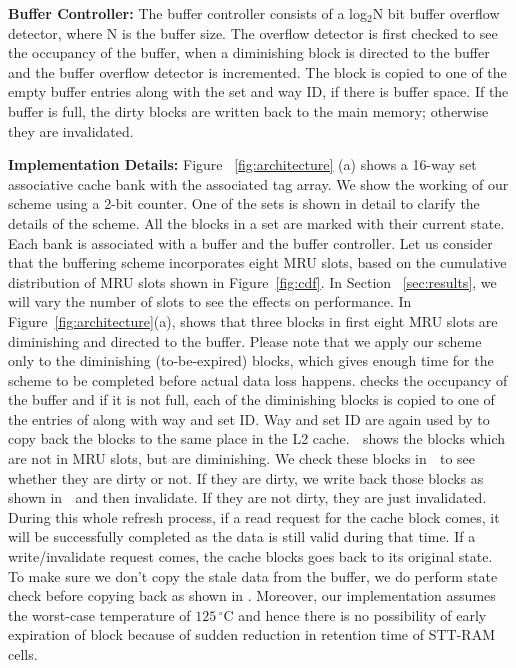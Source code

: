 \noindent\textbf{Buffer Controller:}
The buffer controller consists of a log$_2$N bit buffer overflow detector, where N is the buffer size.
The overflow detector is first checked to see the occupancy of the buffer,
when a diminishing block is directed to the buffer and the buffer overflow detector is incremented.
The block is copied to one of the empty buffer entries along with the set and way ID, if there is
buffer space.
If the buffer is full, the dirty blocks are written back to the main memory; otherwise they are  invalidated.

\begin{figure*} [t]
\centering
  \caption{\label{fig:cdf} Cumulative distribution of diminishing blocks per bank with number of ways}
\end{figure*}

\noindent\textbf{Implementation Details:} Figure ~\ref{fig:architecture} (a) shows a 16-way set
associative cache bank with the associated tag array. We show the working of our scheme using a 2-bit
counter.  One of the sets is shown in detail to clarify the details of the scheme. All the blocks in
a set are marked with their current state. Each bank is  associated with a buffer and the buffer
controller. Let us consider that the buffering scheme incorporates eight MRU slots, based on the
cumulative distribution of MRU slots shown in Figure~\ref{fig:cdf}. In Section ~\ref{sec:results}, we
will vary the number of slots to see the effects on performance. In Figure~\ref{fig:architecture}(a),
 shows that three blocks in first eight MRU slots are diminishing and directed to the
buffer. Please note that we apply our scheme only to the diminishing (to-be-expired) blocks, which gives enough time for the scheme to be completed before actual data loss happens.  checks the occupancy of the buffer and if it is not full, each of the diminishing
blocks is copied to one of the entries of  along with way and set ID. Way and set ID are
again used by    to copy back the blocks to the same place in the L2 cache.
\textcircled{\raisebox{-.9pt}{A}} shows the blocks which are not in MRU slots, but are diminishing.
We check these blocks in \textcircled{\raisebox{-.9pt}{B}} to see whether they are dirty or not. If
they are dirty, we write back those blocks as shown in \textcircled{\raisebox{-.9pt}{C}} and then
invalidate.  If they are not dirty, they are just invalidated. During this whole refresh process, if a read request for the cache block comes, it will be successfully completed as the data is still valid during that time. If a write/invalidate request comes, the cache blocks goes back to its original state. To make sure we don't copy the stale data
from the buffer, we do perform state check before copying back as shown in . Moreover, our implementation assumes the worst-case temperature of $125\,^{\circ}\mathrm{C}$ and hence there is no possibility of early expiration of block because of sudden reduction in retention time of STT-RAM cells.


